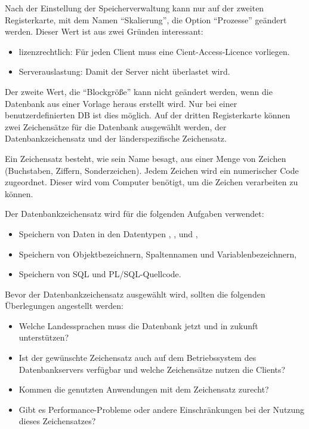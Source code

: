           Nach der Einstellung der Speicherverwaltung kann nur auf der zweiten
          Registerkarte, mit dem Namen \enquote{Skalierung}, die Option
          \enquote{Prozesse} ge\"andert werden. Dieser Wert ist aus zwei
          Gr\"unden interessant:
          \begin{itemize}
            \item lizenzrechtlich: F\"ur jeden Client muss eine
            Cient-Access-Licence vorliegen.
            \item Serverauslastung: Damit der Server nicht \"uberlastet wird.
          \end{itemize}
          Der zweite Wert, die \enquote{Blockgr\"o\ss{}e} kann nicht ge\"andert
          werden, wenn die Datenbank aus einer Vorlage heraus erstellt wird. Nur
          bei einer benutzerdefinierten DB ist dies m\"oglich.
          Auf der dritten Registerkarte k\"onnen zwei Zeichens\"atze f\"ur die
          Datenbank ausgew\"ahlt werden, der Datenbankzeichensatz und der
          l\"anderspezifische Zeichensatz.
          \begin{merke}
            Ein Zeichensatz besteht, wie sein Name besagt, aus einer Menge von Zeichen (Buchstaben,               Ziffern, Sonderzeichen). Jedem Zeichen wird ein numerischer Code zugeordnet. Dieser wird vom Computer ben\"otigt, um die Zeichen verarbeiten zu k\"onnen.
          \end{merke}
          Der Datenbankzeichensatz wird f\"ur die folgenden Aufgaben verwendet:
          \begin{itemize}
            \item Speichern von Daten in den Datentypen , ,  und ,
            \item Speichern von Objektbezeichnern, Spaltennamen und Variablen\-be\-zeich\-nern,
            \item Speichern von SQL und PL/SQL-Quellcode.
          \end{itemize}
          Bevor der Datenbankzeichensatz ausgew\"ahlt wird, sollten die folgenden \"Uberlegungen angestellt werden:
          \begin{itemize}
            \item Welche Landessprachen muss die Datenbank jetzt und in zukunft unterst\"utzen?
            \item Ist der gew\"unschte Zeichensatz auch auf dem Betriebssystem des Datenbankservers verf\"ugbar und welche Zeichens\"atze nutzen die Clients?
            \item Kommen die genutzten Anwendungen mit dem Zeichensatz zurecht?
            \item Gibt es Performance-Probleme oder andere Einschr\"ankungen bei der Nutzung dieses Zeichensatzes?
          \end{itemize}
